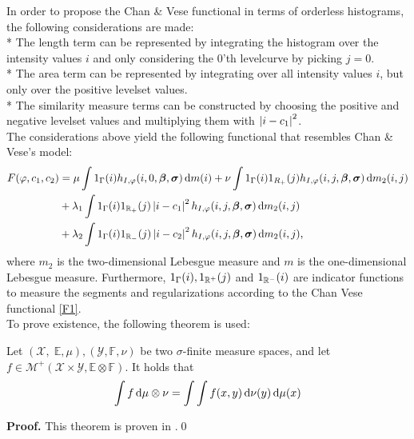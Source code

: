 In order to propose the Chan \& Vese functional in terms of orderless histograms, the following considerations are made:\\
* The length term can be represented by integrating the histogram over the intensity values $i$ and only considering the 0'th levelcurve by picking $j=0$.\\
* The area term can be represented by integrating over all intensity values $i$, but only over the positive levelset values.\\
* The similarity measure terms can be constructed by choosing the positive and negative levelset values and multiplying them with $\left| {i-c_1} \right|^2$.\\

The considerations above yield the following functional that resembles Chan \& Vese's model:
\begin{equation}
  \begin{split}
    F(\phi,c_1,c_2) &= \mu \int 1_\Gamma(i) h_{I,\phi}(i,0,\vec{\beta},\vec{\sigma})\df m(i) + \nu\int 1_{\Gamma}(i)1_{R_+}(j) h_{I,\phi}(i,j,\vec{\beta},\vec{\sigma})\df m_2(i,j)\\
    &+ \lambda_1\int 1_\Gamma(i) 1_{\R_+}(j) \abs{i-c_1}^2h_{I,\phi}(i,j,\vec{\beta},\vec{\sigma})\df m_2(i, j)\\
    &+ \lambda_2\int 1_\Gamma(i) 1_{\R_-}(j) \abs{i-c_2}^2h_{I,\phi}(i,j,\vec{\beta},\vec{\sigma})\df m_2(i, j),
  \end{split}\label{LOLF}
\end{equation}
where $m_2$ is the two-dimensional Lebesgue measure and $m$ is the one-dimensional Lebesgue measure. Furthermore, $1_\Gamma(i), 1_{\mathbb R^+}(j)$ and $1_{\mathbb R^-}(i)$ are indicator functions to measure the segments and regularizations according to the Chan Vese functional \eqref{F1}.\\

To prove existence, the following theorem is used:
\begin{theorem}[Tonelli]\label{Tonelli}
Let $(\mathcal{X},\;\mathbb{E},\mu),(\mathcal{Y},\mathbb{F},\nu)$ be two $\sigma$-finite measure spaces, and let $f\in\mathcal{M}^+(\mathcal{X}\times \mathcal{Y},\mathbb{E}\otimes\mathbb{F})$. It holds that
\begin{equation}
\int f \,{\rm d}\mu\otimes\nu = \int\int f(x,y) \,{\rm d} \nu(y) \,{\rm d} \mu(x)
\end{equation}
\end{theorem}
\textbf{Proof.} This theorem is proven in \cite[p.~195]{hansen.09}.\hfill\qed\\

